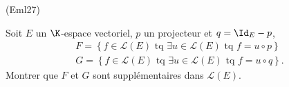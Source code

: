 \begin{tiny}(Eml27)\end{tiny} Soit $E$ un $\K$-espace vectoriel, $p$ un projecteur et $q=\Id_E - p$,
\begin{align*}
 F = \left\lbrace f \in \mathcal{L}(E) \text{ tq } \exists u \in \mathcal{L}(E) \text{ tq } f = u \circ p \right\rbrace \\ 
 G = \left\lbrace f \in \mathcal{L}(E) \text{ tq } \exists u \in \mathcal{L}(E) \text{ tq } f = u \circ q \right\rbrace .
\end{align*}
Montrer que $F$ et $G$ sont supplémentaires dans $\mathcal{L}(E)$.